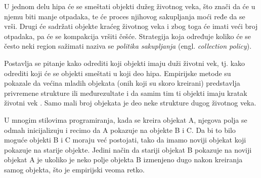 U jednom delu hipa će se smeštati objekti dužeg životnog veka, što znači da će u njemu biti manje otpadaka, te će proces njihovog sakupljanja moći ređe da se vrši. Drugi će sadržati objekte kraćeg životnog veka i zbog toga će imati veći broj otpadaka, pa će se kompakcija vršiti češće. Strategija koja određuje koliko će se često neki region sažimati naziva se \textit{politika sakupljanja} (engl. \textit{collection policy}).

Postavlja se pitanje kako odrediti koji objekti imaju duži životni vek, tj. kako odrediti koji će se objekti smeštati u koji deo hipa. Empirijske metode su pokazale da većina mladih objekata (onih koji su skoro kreirani) predstavlja privremene strukture ili međurezultate i da samim tim ti objekti imaju kratak životni vek \cite{app87}. Samo mali broj objekata je deo neke strukture dugog životnog veka.

U mnogim stilovima programiranja, kada se kreira objekat A, njegova polja se odmah inicijalizuju i recimo da A pokazuje na objekte B i C. Da bi to bilo moguće objekti B i C moraju već postojati, tako da imamo noviji objekat koji pokazuje na starije objekte. Jedini način da stariji objekat B pokazuje na noviji objekat A je ukoliko je neko polje objekta B izmenjeno dugo nakon kreiranja samog objekta, što je empirijski veoma retko.

